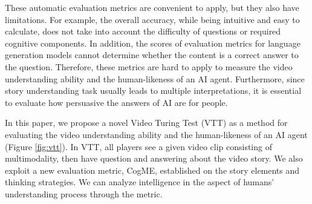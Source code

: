 \documentclass[letterpaper]{article} %
\begin{document}
These automatic evaluation metrics are convenient to apply, but they also have limitations.
For example, the overall accuracy, while being intuitive and easy to calculate, does not take into account the difficulty of questions or required cognitive components.
In addition, the scores of evaluation metrics for language generation models cannot determine whether the content is a correct answer to the question.
Therefore, these metrics are hard to apply to measure the video understanding ability and the human-likeness of an AI agent.
Furthermore, since story understanding task usually leads to multiple interpretations, it is essential to evaluate how persuasive the answers of AI are for people.


In this paper, we propose a novel Video Turing Test (VTT) as a method for evaluating the video understanding ability and the human-likeness of an AI agent (Figure \ref{fig:vtt}). In VTT, all players see a given video clip consisting of multimodality, then have question and answering about the video story. We also exploit a new evaluation metric, CogME, established on the story elements and thinking strategies. We can analyze intelligence in the aspect of humans' understanding process through the metric.

\end{document}
